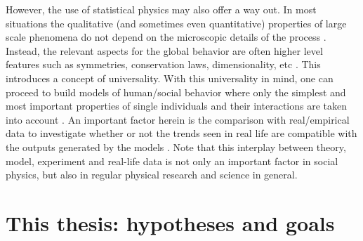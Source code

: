\documentclass[11 pt , letterpaper , twoside , openright]{book}
\begin{document}
However, the use of statistical physics may also offer a way out. In most situations the qualitative (and sometimes even quantitative) properties of large scale phenomena do not depend on the microscopic details of the process \cite{Castellano2009}. Instead, the relevant aspects for the global behavior are often higher level features such as symmetries, conservation laws, dimensionality, etc \cite{Castellano2009}. This introduces a concept of universality. With this universality in mind, one can proceed to build models of human/social behavior where only the simplest and most important properties of single individuals and their interactions are taken into account \cite{Castellano2009}. An important factor herein is the comparison with real/empirical data to investigate whether or not the trends seen in real life are compatible with the outputs generated by the models \cite{Castellano2009}. Note that this interplay between theory, model, experiment and real-life data is not only an important factor in social physics, but also in regular physical research and science in general.




\section{This thesis: hypotheses and goals}\label{goal}
\end{document}

